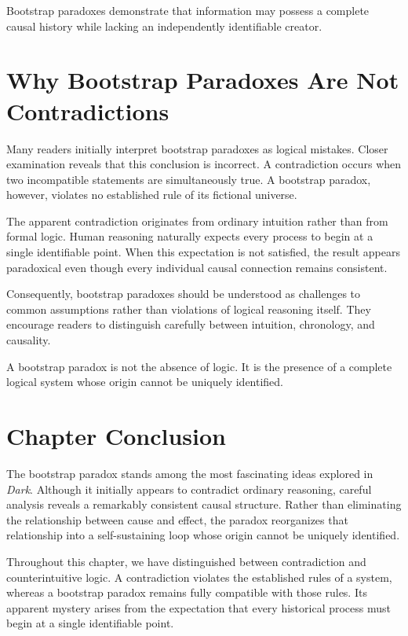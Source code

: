 \documentclass[12pt,oneside,openany]{book}
\begin{document}
\begin{tcolorbox}[colback=cyan!6,colframe=cyan!60!black,title=Analytical Insight]
Bootstrap paradoxes demonstrate that information may possess a complete causal
history while lacking an independently identifiable creator.
\end{tcolorbox}

\section{Why Bootstrap Paradoxes Are Not Contradictions}

Many readers initially interpret bootstrap paradoxes as logical mistakes.
Closer examination reveals that this conclusion is incorrect. A contradiction
occurs when two incompatible statements are simultaneously true. A bootstrap
paradox, however, violates no established rule of its fictional universe.

The apparent contradiction originates from ordinary intuition rather than from
formal logic. Human reasoning naturally expects every process to begin at a
single identifiable point. When this expectation is not satisfied, the result
appears paradoxical even though every individual causal connection remains
consistent.

Consequently, bootstrap paradoxes should be understood as challenges to common
assumptions rather than violations of logical reasoning itself. They encourage
readers to distinguish carefully between intuition, chronology, and causality.

\begin{tcolorbox}[colback=green!8,colframe=green!50!black,title=Key Idea]
A bootstrap paradox is not the absence of logic. It is the presence of a
complete logical system whose origin cannot be uniquely identified.
\end{tcolorbox}
\section{Chapter Conclusion}

The bootstrap paradox stands among the most fascinating ideas explored in
\textit{Dark}. Although it initially appears to contradict ordinary reasoning,
careful analysis reveals a remarkably consistent causal structure. Rather than
eliminating the relationship between cause and effect, the paradox reorganizes
that relationship into a self-sustaining loop whose origin cannot be uniquely
identified.

Throughout this chapter, we have distinguished between contradiction and
counterintuitive logic. A contradiction violates the established rules of a
system, whereas a bootstrap paradox remains fully compatible with those rules.
Its apparent mystery arises from the expectation that every historical process
must begin at a single identifiable point.
\end{document}
